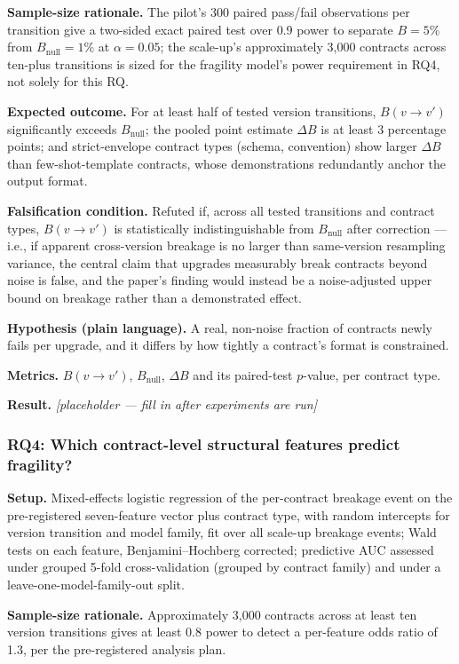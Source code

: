 \documentclass[11pt]{article}
\newcommand{\ph}{\textit{[placeholder --- fill in after experiments are run]}}
\begin{document}
\textbf{Sample-size rationale.} The pilot's 300 paired pass/fail observations per transition give a two-sided exact paired test over 0.9 power to separate $B = 5\%$ from $B_{\text{null}} = 1\%$ at $\alpha = 0.05$; the scale-up's approximately 3{,}000 contracts across ten-plus transitions is sized for the fragility model's power requirement in RQ4, not solely for this RQ.

\textbf{Expected outcome.} For at least half of tested version transitions, $B(v{\to}v')$ significantly exceeds $B_{\text{null}}$; the pooled point estimate $\Delta B$ is at least 3 percentage points; and strict-envelope contract types (schema, convention) show larger $\Delta B$ than few-shot-template contracts, whose demonstrations redundantly anchor the output format.

\textbf{Falsification condition.} Refuted if, across all tested transitions and contract types, $B(v{\to}v')$ is statistically indistinguishable from $B_{\text{null}}$ after correction --- i.e., if apparent cross-version breakage is no larger than same-version resampling variance, the central claim that upgrades measurably break contracts beyond noise is false, and the paper's finding would instead be a noise-adjusted upper bound on breakage rather than a demonstrated effect.

\textbf{Hypothesis (plain language).} A real, non-noise fraction of contracts newly fails per upgrade, and it differs by how tightly a contract's format is constrained.

\textbf{Metrics.} $B(v{\to}v')$, $B_{\text{null}}$, $\Delta B$ and its paired-test $p$-value, per contract type.

\textbf{Result.} \ph

\subsubsection{RQ4: Which contract-level structural features predict fragility?}
\textbf{Setup.} Mixed-effects logistic regression of the per-contract breakage event on the pre-registered seven-feature vector plus contract type, with random intercepts for version transition and model family, fit over all scale-up breakage events; Wald tests on each feature, Benjamini--Hochberg corrected; predictive AUC assessed under grouped 5-fold cross-validation (grouped by contract family) and under a leave-one-model-family-out split.

\textbf{Sample-size rationale.} Approximately 3{,}000 contracts across at least ten version transitions gives at least 0.8 power to detect a per-feature odds ratio of 1.3, per the pre-registered analysis plan.
\end{document}
